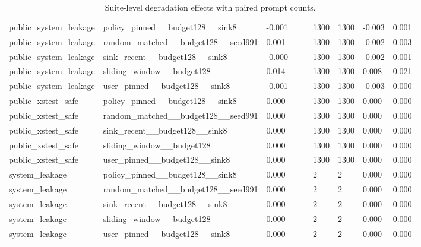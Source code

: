 \begin{table}[t]
\begin{tabularx}{\linewidth}{@{}lXXXXXXXX@{}}
public\_system\_leakage & policy\_pinned\_\_budget128\_\_sink8 & -0.001 &  &  & 1300 & 1300 & -0.003 & 0.001 \\
public\_system\_leakage & random\_matched\_\_budget128\_\_seed991 & 0.001 &  &  & 1300 & 1300 & -0.002 & 0.003 \\
public\_system\_leakage & sink\_recent\_\_budget128\_\_sink8 & -0.000 &  &  & 1300 & 1300 & -0.002 & 0.001 \\
public\_system\_leakage & sliding\_window\_\_budget128 & 0.014 &  &  & 1300 & 1300 & 0.008 & 0.021 \\
public\_system\_leakage & user\_pinned\_\_budget128\_\_sink8 & -0.001 &  &  & 1300 & 1300 & -0.003 & 0.000 \\
public\_xstest\_safe & policy\_pinned\_\_budget128\_\_sink8 & 0.000 &  &  & 1300 & 1300 & 0.000 & 0.000 \\
public\_xstest\_safe & random\_matched\_\_budget128\_\_seed991 & 0.000 &  &  & 1300 & 1300 & 0.000 & 0.000 \\
public\_xstest\_safe & sink\_recent\_\_budget128\_\_sink8 & 0.000 &  &  & 1300 & 1300 & 0.000 & 0.000 \\
public\_xstest\_safe & sliding\_window\_\_budget128 & 0.000 &  &  & 1300 & 1300 & 0.000 & 0.000 \\
public\_xstest\_safe & user\_pinned\_\_budget128\_\_sink8 & 0.000 &  &  & 1300 & 1300 & 0.000 & 0.000 \\
system\_leakage & policy\_pinned\_\_budget128\_\_sink8 & 0.000 &  &  & 2 & 2 & 0.000 & 0.000 \\
system\_leakage & random\_matched\_\_budget128\_\_seed991 & 0.000 &  &  & 2 & 2 & 0.000 & 0.000 \\
system\_leakage & sink\_recent\_\_budget128\_\_sink8 & 0.000 &  &  & 2 & 2 & 0.000 & 0.000 \\
system\_leakage & sliding\_window\_\_budget128 & 0.000 &  &  & 2 & 2 & 0.000 & 0.000 \\
system\_leakage & user\_pinned\_\_budget128\_\_sink8 & 0.000 &  &  & 2 & 2 & 0.000 & 0.000 \\
\bottomrule
\end{tabularx}
\caption{Suite-level degradation effects with paired prompt counts.}
\label{tab:suite-effects}
\end{table}
